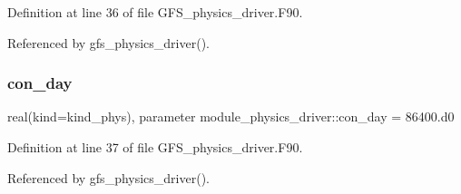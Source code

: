 Definition at line 36 of file G\+F\+S\+\_\+physics\+\_\+driver.\+F90.



Referenced by gfs\+\_\+physics\+\_\+driver().

\mbox{\label{namespacemodule__physics__driver_a64463ae0b1eefb125fa00ada423e8b4d}} 
\subsubsection{con\+\_\+day}
{\footnotesize\ttfamily real(kind=kind\+\_\+phys), parameter module\+\_\+physics\+\_\+driver\+::con\+\_\+day = 86400.d0}



Definition at line 37 of file G\+F\+S\+\_\+physics\+\_\+driver.\+F90.



Referenced by gfs\+\_\+physics\+\_\+driver().

